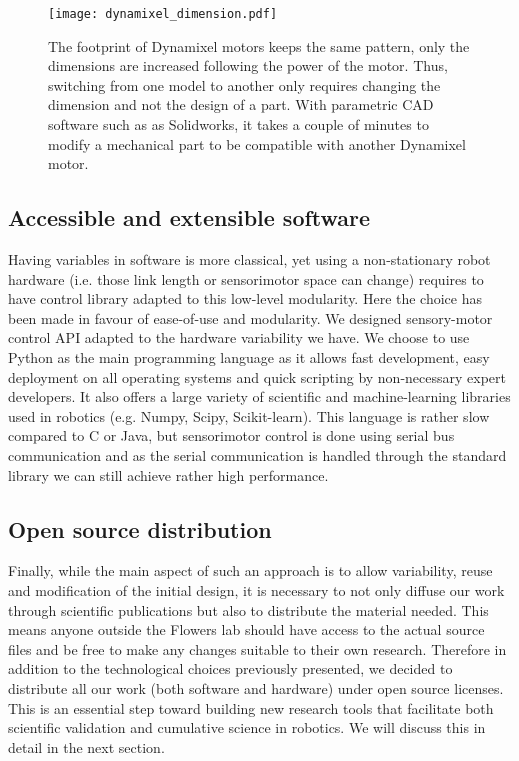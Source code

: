 \begin{figure}[tb]
    \begin{center}
        \texttt{[image: dynamixel\_dimension.pdf]}
    \end{center}
    \caption{The footprint of Dynamixel motors keeps the same pattern, only the dimensions are increased following the power of the motor. Thus, switching from one model to another only requires changing the dimension and not the design of a part. With parametric CAD software such as as Solidworks, it takes a couple of minutes to modify a mechanical part to be compatible with another Dynamixel motor.}
    \label{fig:dynamixel_dimension}
\end{figure}


\subsection{Accessible and extensible software} %

Having variables in software is more classical, yet using a non-stationary robot hardware (i.e. those link length or sensorimotor space can change) requires to have control library adapted to this low-level modularity. Here the choice has been made in favour of ease-of-use and modularity. We designed sensory-motor control API adapted to the hardware variability we have. We choose to use Python as the main programming language as it allows fast development, easy deployment on all operating systems and quick scripting by non-necessary expert developers. It also offers a large variety of scientific and machine-learning libraries used in robotics (e.g. Numpy, Scipy, Scikit-learn).
This language is rather slow compared to C or Java, but sensorimotor control is done using serial bus communication and as the serial communication is handled through the standard library we can still achieve rather high performance.

\subsection{Open source distribution} %

Finally, while the main aspect of such an approach is to allow variability, reuse and modification of the initial design, it is necessary to not only diffuse our work through scientific publications but also to distribute the material needed.
This means anyone outside the Flowers lab should have access to the actual source files and be free to make any changes suitable to their own research. Therefore in addition to the technological choices previously presented, we decided to distribute all our work (both software and hardware) under open source licenses.
This is an essential step toward building new research tools that facilitate both scientific validation and cumulative science in robotics. We will discuss this in detail in the next section.


